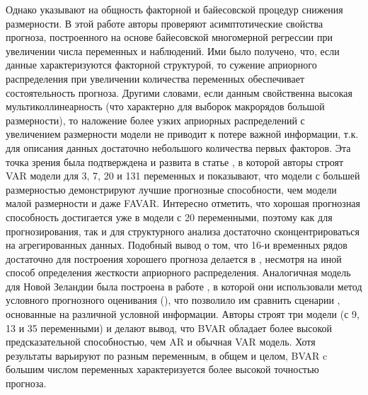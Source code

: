 \documentclass[11pt]{article} %
\begin{document}
Однако \cite{demol_al_2008} указывают на общность факторной и байесовской процедур снижения размерности. В этой работе авторы проверяют асимптотические свойства прогноза, построенного на основе байесовской многомерной регрессии при увеличении числа переменных и наблюдений. Ими было получено, что, если данные характеризуются факторной структурой, то сужение априорного распределения при увеличении количества переменных обеспечивает состоятельность прогноза. Другими словами, если данным свойственна высокая мультиколлинеарность (что характерно для выборок макрорядов большой размерности), то наложение более узких априорных распределений с увеличением размерности модели  не  приводит к потере важной информации, т.к. для описания данных достаточно небольшого количества первых факторов.  Эта точка зрения  была подтверждена и развита в статье \cite{banbura_al_2010}, в которой авторы  строят VAR модели для 3, 7, 20 и 131 переменных и показывают, что модели с большей размерностью демонстрируют лучшие прогнозные способности, чем модели малой размерности и даже FAVAR. Интересно отметить, что хорошая прогнозная способность достигается уже в модели с 20  переменными, поэтому как для прогнозирования, так и для структурного анализа достаточно сконцентрироваться на агрегированных данных. 
Подобный вывод о том, что 16-и временных рядов достаточно для построения хорошего прогноза делается в \cite{beauchemin_zaman_2011}, несмотря на иной способ определения жесткости априорного распределения. 
  Аналогичная модель для Новой Зеландии была построена в работе \cite{bloor_matheson_2010}, в которой они использовали метод условного прогнозного оценивания (\cite{waggoner_zha_1999}), что позволило им сравнить сценарии , основанные на различной условной информации.  Авторы строят три модели (с 9, 13 и 35 переменными) и  делают вывод, что BVAR обладает более высокой предсказательной способностью, чем AR и обычная VAR модель.  Хотя результаты варьируют по разным переменным, в общем и целом, BVAR c большим числом переменных характеризуется более высокой точностью прогноза.
\end{document}
